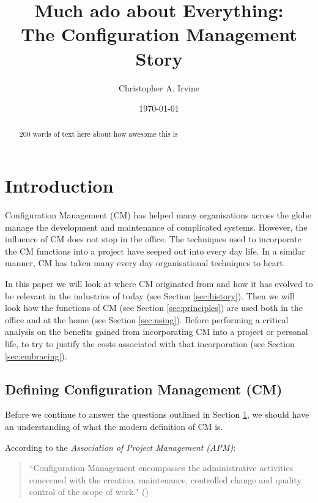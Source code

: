 \documentclass[cmpstyle]{ueacmpstyle}
\begin{document}
	\title{Much ado about Everything: \\ The Configuration Management Story}
	\author{Christopher A. Irvine}
	\date{\today}
	\maketitle
	
	\begin{abstract}
		200 words of text here about how awesome this is
	\end{abstract}

	\section{Introduction} \label{sec:intro}
	Configuration Management (CM) has helped many organisations across the globe manage the development and maintenance of complicated systems. However, the influence of CM does not stop in the office. The techniques used to incorporate the CM functions into a project have seeped out into every day life. In a similar manner, CM has taken many every day organisational techniques to heart. 
	
	In this paper we will look at where CM originated from and how it has evolved to be relevant in the industries of today (see Section \ref{sec:history}). Then we will look how the functions of CM (see Section \ref{sec:principles}) are used both in the office and at the home (see Section \ref{sec:using}). Before performing a critical analysis on the benefits gained from incorporating CM into a project or personal life, to try to justify the costs associated with that incorporation (see Section \ref{sec:embracing}). 
	
		\subsection{Defining Configuration Management (CM)} \label{sec:definition}
		Before we continue to answer the questions outlined in Section \ref{sec:intro}, we should have an understanding of what the modern definition of CM is. 
		
		According to the \emph{Association of Project Management (APM)}: 
		
		\begin{quote}
		``Configuration Management encompasses the administrative activities concerned with the creation, maintenance, controlled change and quality control of the scope of work." (\cite{apmDef})
		\end{quote}
		
\end{document}
